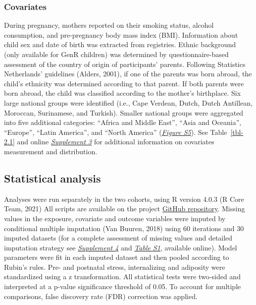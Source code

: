 \documentclass[
  letterpaper,
  DIV=11,
  numbers=noendperiod]{scrreport}
\begin{document}
\subsubsection{Covariates}\label{covariates}

During pregnancy, mothers reported on their smoking status, alcohol
consumption, and pre-pregnancy body mass index (BMI). Information about
child sex and date of birth was extracted from registries. Ethnic
background (only available for GenR children) was determined by
questionnaire-based assessment of the country of origin of participants'
parents. Following Statistics Netherlands' guidelines (Alders, 2001), if
one of the parents was born abroad, the child's ethnicity was determined
according to that parent. If both parents were born abroad, the child
was classified according to the mother's birthplace. Six large national
groups were identified (i.e., Cape Verdean, Dutch, Dutch Antillean,
Moroccan, Surinamese, and Turkish). Smaller national groups were
aggregated into five additional categories: ``Africa and Middle East'',
``Asia and Oceania'', ``Europe'', ``Latin America'', and ``North
America'' (\href{https://osf.io/xs29c}{\emph{Figure S5}}). See
Table~\ref{tbl-2.1} and online
\href{https://osf.io/xs29c}{\emph{Supplement 3}} for additional
information on covariates measurement and distribution.

\subsection{Statistical analysis}\label{statistical-analysis}

Analyses were run separately in the two cohorts, using R version 4.0.3
(R Core Team, 2021) All scripts are available on the project
\href{https://github.com/SereDef/association-ELS-PCM-project}{GitHub
repository}. Missing values in the exposure, covariate and outcome
variables were imputed by conditional multiple imputation (Van Buuren,
2018) using 60 iterations and 30 imputed datasets (for a complete
assessment of missing values and detailed imputation strategy see
\href{https://osf.io/xs29c}{\emph{Supplement 4}} and
\href{https://osf.io/7e4x8}{\emph{Table S1}}, available online). Model
parameters were fit in each imputed dataset and then pooled according to
Rubin's rules. Pre- and postnatal stress, internalizing and adiposity
were standardized using a z transformation. All statistical tests were
two-sided and interpreted at a p-value significance threshold of 0.05.
To account for multiple comparisons, false discovery rate (FDR)
correction was applied.
\end{document}
